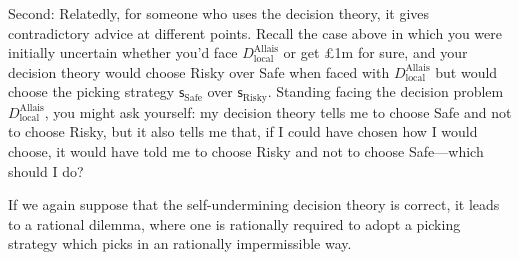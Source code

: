 \documentclass[a4paper,final]{article}
\newcommand\s{\mathsf{s}}
\newenvironment{CCM rewritten}
{\begingroup\color{blue}} %
{\endgroup}              %
\begin{document}


Second: Relatedly, for someone who uses the decision theory, it gives contradictory advice at different points. Recall the case above in which you were initially uncertain whether you'd face $D^\mathrm{Allais}_\mathrm{local}$ or get \pounds 1m for sure, and your decision theory would choose Risky over Safe when faced with $D^\mathrm{Allais}_\mathrm{local}$ but would choose the picking strategy $\s_\mathrm{Safe}$ over $\s_\mathrm{Risky}$. Standing facing the decision problem $D^\mathrm{Allais}_\mathrm{local}$, you might ask yourself: my decision theory tells me to choose Safe and not to choose Risky, but it also tells me that, if I could have chosen how I would choose, it would have told me to choose Risky and not to choose Safe---which should I do?

If we again suppose that the self-undermining decision theory is correct, it leads to a rational dilemma, where one is rationally required to adopt a picking strategy which picks in an rationally impermissible way. 
\end{document}
